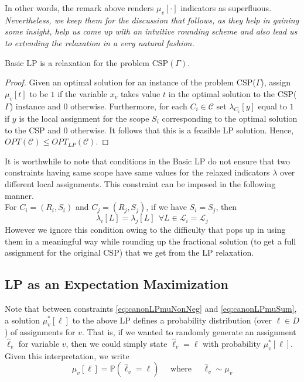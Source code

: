 In other words, the remark above renders $\mu_v[\cdot]$ indicators as superfluous. \emph{Nevertheless, we keep them for the discussion that follows, as they help in gaining some insight, help us come up with an intuitive rounding scheme and also lead us to extending the relaxation in a very natural fashion.}

\begin{thm}
	Basic LP is a relaxation for the problem CSP$(\Gamma)$.
\end{thm}
\begin{proof}
	Given an optimal solution for an instance of the problem CSP($\Gamma$), assign $\mu_v[t]$ to be $1$ if the variable $x_v$ takes value $t$ in the optimal solution to the CSP($\Gamma$) instance and $0$ otherwise.
	Furthermore, for each $C_i \in \mathcal{C}$ set $\lambda_{C_i}[y]$ equal to $1$ if $y$ is the local assignment for the scope $S_i$ corresponding to the optimal solution to the CSP and $0$ otherwise. 
	It follows that this is a feasible LP solution. 
	Hence, $OPT(\mathcal{C}) \le OPT_{LP}(\mathcal{C})$.
\end{proof}

\begin{remark}
It is worthwhile to note that conditions in the Basic LP do not ensure that two constraints having same scope have same values for the relaxed indicators $\lambda$ over different local assignments. This constraint can be imposed in the following manner.\\
For $C_{i}=(R_i, S_i)$ and $C_j=(R_j, S_j)$, if we have $S_i = S_j$, then
\begin{equation}\label{extracons}
\lambda_i[L] =   \lambda_j[L] ~ \ \forall L \in \mathcal L_i = \mathcal L_j
\end{equation}
However we ignore this condition owing to the difficulty that pops up in using them in a meaningful way while rounding up the fractional solution (to get a full assignment for the original CSP) that we get from the LP relaxation.  
\end{remark}

\subsection{LP as an Expectation Maximization}
Note that between constraints \ref{eq:canonLPmuNonNeg} and \ref{eq:canonLPmuSum}, a solution $\mu^*_v[\ell]$ to the above LP defines a probability distribution (over $\ell \in D$) of assignments for $v$. That is, if we wanted to randomly generate an assignment $\hat{\ell}_v$ for variable $v$, then we could simply state $\hat{\ell}_v = \ell$ with probability $\mu^*_v[\ell]$. Given this interpretation, we write
\begin{equation}
\mu_v[\ell] = \mathbb{P}\left( \hat{\ell}_v = \ell \right) \quad \text{ where } \quad \hat{\ell}_v \sim \mu_v 
\end{equation}

